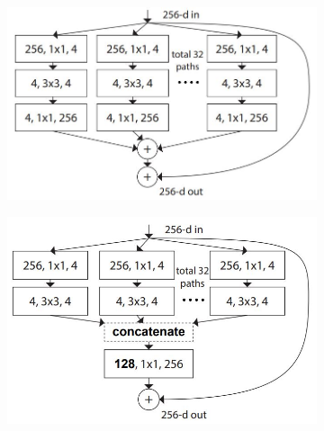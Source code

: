\begin{figure}[h!]
    \centering %
    \begin{subfigure}{0.33\textwidth}
        \includegraphics[width=\linewidth]{Images/Chapter2/resnext1.JPG}
        \caption{}
        \label{fig:ch2-resnext1}
    \end{subfigure}\hfil %
    \begin{subfigure}{0.33\textwidth}
        \includegraphics[width=\linewidth]{Images/Chapter2/resnext2.JPG}
        \caption{}
        \label{fig:ch2-resnext2}
    \end{subfigure}\hfil %
    \begin{subfigure}{0.33\textwidth}

\end{subfigure}
\end{figure}
